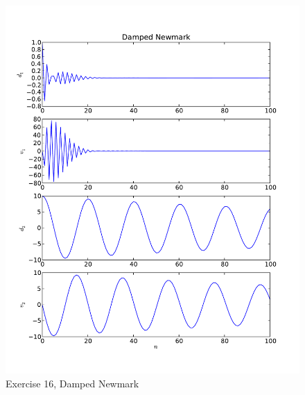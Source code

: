 \documentclass[12pt]{article}
\begin{document}
\begin{figure}[h!]
\centering
\includegraphics[height=0.9\textheight]{dn1.pdf}
\caption{Exercise 16, Damped Newmark}
\end{figure}
\end{document}
